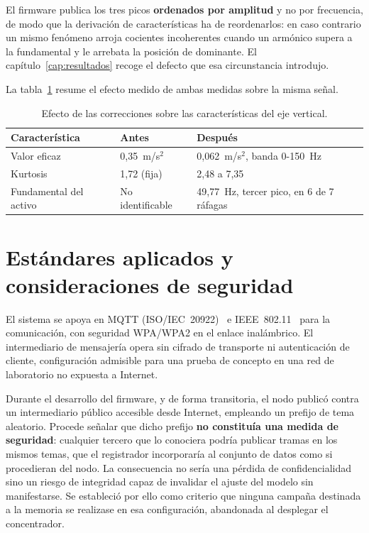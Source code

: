 El firmware publica los tres picos \textbf{ordenados por amplitud} y no por frecuencia, de modo
que la derivación de características ha de reordenarlos: en caso contrario un mismo fenómeno
arroja cocientes incoherentes cuando un armónico supera a la fundamental y le arrebata la
posición de dominante. El capítulo~\ref{cap:resultados} recoge el defecto que esa
circunstancia introdujo.

La tabla~\ref{table:resonancia-efecto} resume el efecto medido de ambas medidas sobre la misma señal.

\begin{table}[ht!]
\caption{Efecto de las correcciones sobre las características del eje vertical.}
\label{table:resonancia-efecto}
\centering
\begin{tabular}{|p{4.2cm}|p{3.4cm}|p{4.4cm}|}
\hline
\textbf{Característica} & \textbf{Antes} & \textbf{Después} \\
\hline
Valor eficaz & \mbox{0,35 m/s$^2$} & \mbox{0,062 m/s$^2$}, banda \mbox{0-150 Hz} \\
\hline
Kurtosis & 1,72 (fija) & 2,48 a 7,35 \\
\hline
Fundamental del activo & No identificable & \mbox{49,77 Hz}, tercer pico, en 6 de 7 ráfagas \\
\hline
\end{tabular}
\end{table}

\section{Estándares aplicados y consideraciones de seguridad}

El sistema se apoya en MQTT (ISO/IEC~20922)~\cite{isoiec20922} e IEEE~802.11~\cite{ieee80211}
para la comunicación, con seguridad WPA/WPA2 en el enlace inalámbrico. El intermediario de
mensajería opera sin cifrado de transporte ni autenticación de cliente, configuración admisible
para una prueba de concepto en una red de laboratorio no expuesta a Internet.

Durante el desarrollo del firmware, y de forma transitoria, el nodo publicó contra un
intermediario público accesible desde Internet, empleando un prefijo de tema aleatorio. Procede
señalar que dicho prefijo \textbf{no constituía una medida de seguridad}: cualquier tercero que
lo conociera podría publicar tramas en los mismos temas, que el registrador incorporaría al
conjunto de datos como si procedieran del nodo. La consecuencia no sería una pérdida de
confidencialidad sino un riesgo de integridad capaz de invalidar el ajuste del modelo sin
manifestarse. Se estableció por ello como criterio que ninguna campaña destinada a la memoria se
realizase en esa configuración, abandonada al desplegar el concentrador.

